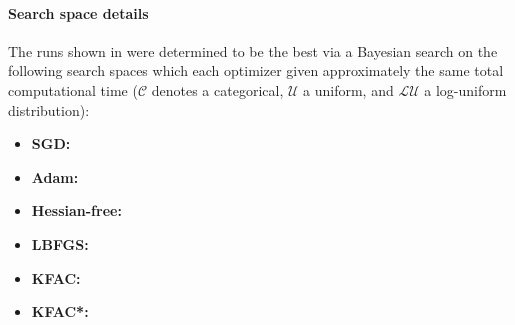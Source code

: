 \paragraph{Search space details} The runs shown in  were determined to be the best via a Bayesian search on the following search spaces which each optimizer given approximately the same total computational time ($\mathcal{C}$ denotes a categorical, $\mathcal{U}$ a uniform, and $\mathcal{LU}$ a log-uniform distribution):
\begin{itemize}
  \def\pathToRuns{../kfac_pinns_exp/exp31_heat4d_mlp_tanh_256_bayes/tex/}
\item \textbf{SGD:} 
\item \textbf{Adam:} 
\item \textbf{Hessian-free:} 
\item \textbf{LBFGS:} 
\item \textbf{KFAC:} 
\item \textbf{KFAC*:} 
\end{itemize}

